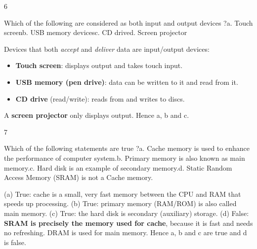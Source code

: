 \begin{question}{6}
{Which of the following are considered as both input and output devices ?\newline a. Touch screen\newline b. USB memory devices\newline c. CD drive\newline d. Screen projector\par}
\begin{explain}
Devices that both \emph{accept} and \emph{deliver} data are input/output devices:
\begin{itemize}
\item \textbf{Touch screen}: displays output and takes touch input.
\item \textbf{USB memory (pen drive)}: data can be written to it and read from it.
\item \textbf{CD drive} (read/write): reads from and writes to discs.
\end{itemize}
A \textbf{screen projector} only displays output. Hence a, b and c.
\end{explain}
\end{question}

\begin{question}{7}
{Which of the following statements are true ?\newline a. Cache memory is used to enhance the performance of computer system.\newline b. Primary memory is also known as main memory.\newline c. Hard disk is an example of secondary memory.\newline d. Static Random Access Memory (SRAM) is not a Cache memory.\par}
\begin{explain}
(a) True: cache is a small, very fast memory between the CPU and RAM that speeds up processing.
(b) True: primary memory (RAM/ROM) is also called main memory.
(c) True: the hard disk is secondary (auxiliary) storage.
(d) False: \textbf{SRAM is precisely the memory used for cache}, because it is fast and needs no refreshing. DRAM is used for main memory.
Hence a, b and c are true and d is false.
\end{explain}
\end{question}

